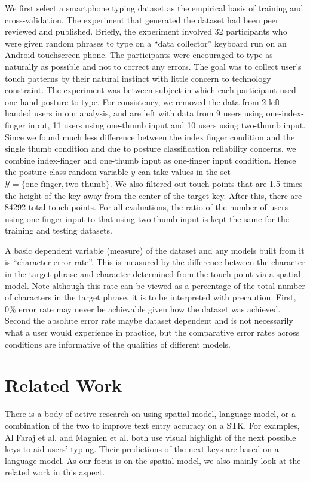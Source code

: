 \documentclass{sigchi}
\begin{document}
We first select a smartphone typing dataset as the empirical basis of training and cross-validation. The experiment that generated the dataset had been peer reviewed and published. Briefly, the experiment involved 32 participants who were given random phrases to type on a “data collector” keyboard run on an Android touchscreen phone.  The participants were encouraged to type as naturally as possible and not to correct any errors. The goal was to collect user’s touch patterns by their natural instinct with little concern to technology constraint. The experiment was between-subject in which each participant used one hand posture to type. For consistency, we removed the data from 2 left-handed users in our analysis, and are left with data from 9 users using one-index-finger input, 11 users using one-thumb input and
10 users using two-thumb input.  Since we found much less difference between the index finger condition and the single thumb condition and due to posture classification reliability concerns, we combine index-finger and one-thumb input as one-finger input condition. Hence the posture class random variable $y$ can take values in the set $\mathcal{Y} = \{\text{one-finger}, \text{two-thumb}\}$. We also filtered out touch points that are 1.5 times the height of the key away from the center of the target key. After this, there are 84292 total touch points. For all evaluations, the ratio of the number of users using one-finger input to that using two-thumb input is kept the same for the training and testing datasets. 

A basic dependent variable (measure) of the dataset and any models built from it is “character error rate”. This is measured by the difference between the character in the target phrase and character determined from the touch point via a spatial model. Note although this rate can be viewed as a percentage of the total number of characters in the target phrase, it is to be interpreted with precaution. First, 0\% error rate may never be achievable given how the dataset was achieved. Second the absolute error rate maybe dataset dependent and is not necessarily what a user would experience in practice, but the comparative error rates across conditions are informative of the qualities of different models.

\section{Related Work}

There is a body of active research on using spatial model, language model, or a combination
of the two to improve text entry accuracy on a STK. For examples, 
Al Faraj et al. \cite{AlFaraj:2009} and Magnien et al. \cite{Magnien:2004} both use
visual highlight of the next possible keys to aid users' typing. Their predictions of the next keys are based on a language model. As our focus is on the 
spatial model, we also mainly look at the related work in this aspect.    
\end{document}
